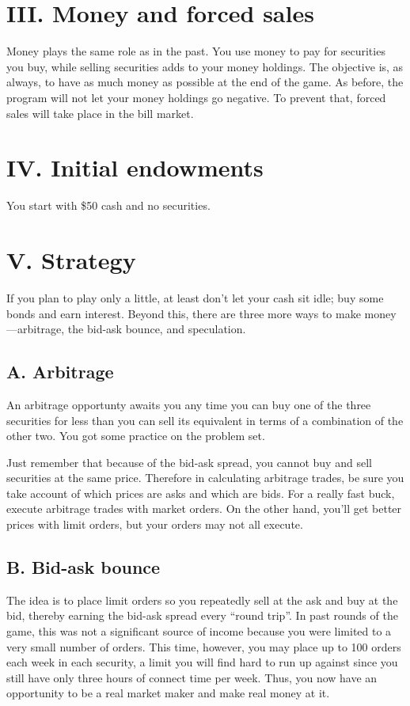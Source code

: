 \section{III. Money and forced sales}%
Money plays the same role as in the past.  You use money to pay for
securities you buy, while selling securities adds to your money
holdings.  The objective is, as always, to have as much money as
possible at the end of the game.  As before, the program will not let
your money holdings go negative.  To prevent that, forced sales will
take place in the bill market.

\section{IV. Initial endowments}%
You start with \$50 cash and no securities.

\section{V. Strategy}%
If you plan to play only a little, at least don't let your cash sit
idle; buy some bonds and earn interest.  Beyond this, there are three
more ways to make money---arbitrage, the bid-ask bounce, and
speculation.

\subsection{A. Arbitrage}%
An arbitrage opportunty awaits you any time you can buy one of the
three securities for less than you can sell its equivalent in terms
of a combination of the other two.  You got some practice on the
problem set.

Just remember that because of the bid-ask spread, you cannot buy and
sell securities at the same price.  Therefore in calculating
arbitrage trades, be sure you take account of which prices are asks
and which are bids.  For a really fast buck, execute arbitrage trades
with market orders.  On the other hand, you'll get better prices with
limit orders, but your orders may not all execute.

\subsection{B. Bid-ask bounce}%
The idea is to place limit orders so you repeatedly sell at the ask
and buy at the bid, thereby earning the bid-ask spread every ``round
trip''.  In past rounds of the game, this was not a significant source
of income because you were limited to a very small number of orders.
This time, however, you may place up to 100 orders each week in each
security, a limit you will find hard to run up against since you still
have only three hours of connect time per week.  Thus, you now have 
an opportunity to be a real market maker and make real money at it.

